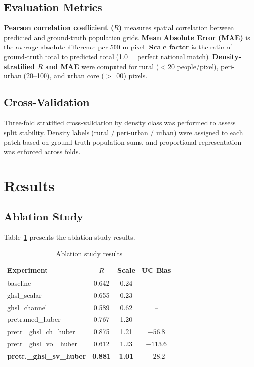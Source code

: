 \documentclass[conference]{IEEEtran}
\begin{document}
\subsection{Evaluation Metrics}
\label{subsec:metrics}

\textbf{Pearson correlation coefficient ($R$)} measures spatial correlation between predicted and ground-truth population grids. \textbf{Mean Absolute Error (MAE)} is the average absolute difference per 500 m pixel. \textbf{Scale factor} is the ratio of ground-truth total to predicted total (1.0 = perfect national match). \textbf{Density-stratified $R$ and MAE} were computed for rural ($< 20$ people/pixel), peri-urban (20--100), and urban core ($> 100$) pixels.

\subsection{Cross-Validation}
\label{subsec:cv}

Three-fold stratified cross-validation by density class was performed to assess split stability. Density labels (rural / peri-urban / urban) were assigned to each patch based on ground-truth population sums, and proportional representation was enforced across folds.

\section{Results}
\label{sec:results}

\subsection{Ablation Study}
\label{subsec:ablation}

Table~\ref{tab:ablation_results} presents the ablation study results.

\begin{table}[htbp]
\caption{Ablation study results}
\label{tab:ablation_results}
\centering
\begin{tabular}{@{}lccc@{}}
\toprule
\textbf{Experiment} & \textbf{$R$} & \textbf{Scale} & \textbf{UC Bias} \\
\midrule
baseline & 0.642 & 0.24 & -- \\
ghsl\_scalar & 0.655 & 0.23 & -- \\
ghsl\_channel & 0.589 & 0.62 & -- \\
pretrained\_huber & 0.767 & 1.20 & -- \\
pretr.\_ghsl\_ch\_huber & 0.875 & 1.21 & $-56.8$ \\
pretr.\_ghsl\_vol\_huber & 0.612 & 1.23 & $-113.6$ \\
\textbf{pretr.\_ghsl\_sv\_huber} & \textbf{0.881} & \textbf{1.01} & $\mathbf{-28.2}$ \\
\bottomrule
\end{tabular}
\end{table}
\end{document}
